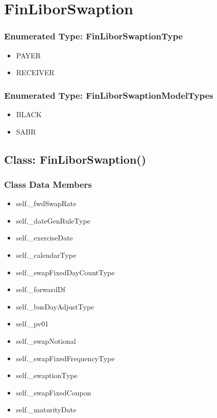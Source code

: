 \documentclass[twoside,11pt]{book}
\begin{document}
\newpage
\section{FinLiborSwaption}

\subsubsection{Enumerated Type: FinLiborSwaptionType}
\begin{itemize}
\item{PAYER}
\item{RECEIVER}
\end{itemize}

\subsubsection{Enumerated Type: FinLiborSwaptionModelTypes}
\begin{itemize}
\item{BLACK}
\item{SABR}
\end{itemize}

\subsection{Class: FinLiborSwaption()}


\subsubsection{Class Data Members}
\begin{itemize}
\item{self.\_fwdSwapRate}
\item{self.\_dateGenRuleType}
\item{self.\_exerciseDate}
\item{self.\_calendarType}
\item{self.\_swapFixedDayCountType}
\item{self.\_forwardDf}
\item{self.\_busDayAdjustType}
\item{self.\_pv01}
\item{self.\_swapNotional}
\item{self.\_swapFixedFrequencyType}
\item{self.\_swaptionType}
\item{self.\_swapFixedCoupon}
\item{self.\_maturityDate}
\end{itemize}
\end{document}
